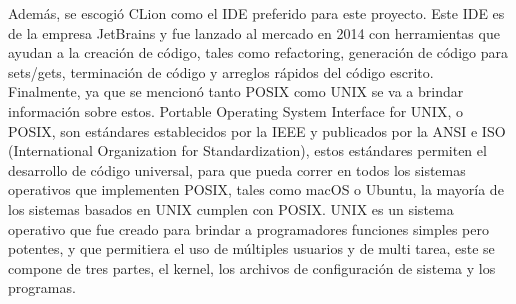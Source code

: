 \documentclass[12pt, article, natbib]{IEEEtran}
\begin{document}
Además, se escogió CLion como el IDE preferido para este proyecto. Este IDE es de la empresa JetBrains y fue lanzado al mercado en 2014\cite{avram_2014_jetbrains} con herramientas que ayudan a la creación de código, tales como refactoring, generación de código para sets/gets, terminación de código y arreglos rápidos del código escrito.\cite{jetbrains_intelligent}\\

Finalmente, ya que se mencionó tanto POSIX como UNIX se va a brindar información sobre estos. Portable Operating System Interface for UNIX, o POSIX, son estándares establecidos por la IEEE y publicados por la ANSI e ISO (International Organization for Standardization), estos estándares permiten el desarrollo de código universal, para que pueda correr en todos los sistemas operativos que implementen POSIX, tales como macOS o Ubuntu, la mayoría de los sistemas basados en UNIX cumplen con POSIX.\cite{universityinformationtechnologyservices_2021_about} UNIX es un sistema operativo que fue creado para brindar a programadores funciones simples pero potentes, y que permitiera el uso de múltiples usuarios y de multi tarea, este se compone de tres partes, el kernel, los archivos de configuración de sistema y los programas.\cite{idahostateuniversity_1997_what}
\end{document}
